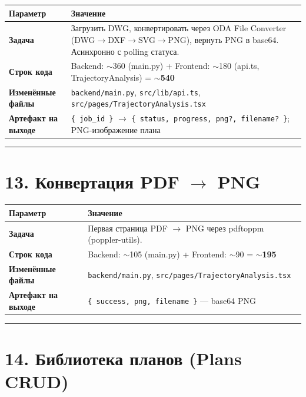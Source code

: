 \documentclass[12pt,a4paper]{article}
\begin{document}
\begin{tabular}{>{\bfseries}l p{10cm}}
\toprule
Параметр & Значение \\
\midrule
Задача & Загрузить DWG, конвертировать через ODA File Converter (DWG$\rightarrow$DXF$\rightarrow$SVG$\rightarrow$PNG), вернуть PNG в base64. Асинхронно с polling статуса. \\
Строк кода & Backend: $\sim$360 (main.py) + Frontend: $\sim$180 (api.ts, TrajectoryAnalysis) = \textbf{$\sim$540} \\
Изменённые файлы & \texttt{backend/main.py}, \texttt{src/lib/api.ts}, \texttt{src/pages/TrajectoryAnalysis.tsx} \\
Артефакт на выходе & \texttt{\{ job\_id \}} $\rightarrow$ \texttt{\{ status, progress, png?, filename? \}}; PNG-изображение плана \\
\bottomrule
\end{tabular}

\vspace{1em}
\hrule
\vspace{1em}

\section{13. Конвертация PDF $\rightarrow$ PNG}

\begin{tabular}{>{\bfseries}l p{10cm}}
\toprule
Параметр & Значение \\
\midrule
Задача & Первая страница PDF $\rightarrow$ PNG через pdftoppm (poppler-utils). \\
Строк кода & Backend: $\sim$105 (main.py) + Frontend: $\sim$90 = \textbf{$\sim$195} \\
Изменённые файлы & \texttt{backend/main.py}, \texttt{src/pages/TrajectoryAnalysis.tsx} \\
Артефакт на выходе & \texttt{\{ success, png, filename \}} — base64 PNG \\
\bottomrule
\end{tabular}

\vspace{1em}
\hrule
\vspace{1em}

\section{14. Библиотека планов (Plans CRUD)}
\end{document}
